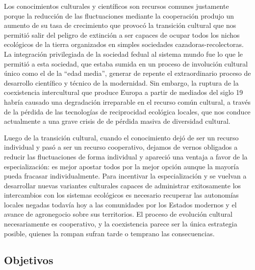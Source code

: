 \documentclass[a4paper,10pt]{book}
\theoremstyle{definition}
\begin{document}

Los conocimientos culturales y cient\'ificos son recursos comunes justamente porque la reducci\'on de las fluctuaciones mediante la cooperaci\'on produjo un aumento de su tasa de crecimiento que provoc\'o la transici\'on cultural que nos permiti\'o salir del peligro de extinci\'on a ser capaces de ocupar todos los nichos ecol\'ogicos de la tierra organizados en simples sociedades cazadoras-recolectoras.
%
La integraci\'on privilegiada de la sociedad fedual al sistema mundo fue lo que le permiti\'o a esta sociedad, que estaba sumida en un proceso de involuci\'on cultural \'unico como el de la ``edad media'', generar de repente el extraordinario proceso de desarrollo cient\'ifico y t\'ecnico de la modernidad.
%
Sin embargo, la ruptura de la coexistencia intercultural que produce Europa a partir de mediados del siglo 19 habr\'ia causado una degradaci\'on irreparable en el recurso común cultural, a través de la pérdida de las tecnolog\'ias de reciprocidad ecol\'ogica locales, que nos conduce actualmente a una grave crisis de de pérdida masiva de diversidad cultural.


Luego de la transici\'on cultural, cuando el conocimiento dej\'o de ser un recurso individual y pas\'o a ser un recurso cooperativo, dejamos de vernos obligados a reducir las fluctuaciones de forma individual y apareci\'o una ventaja a favor de la especializaci\'on: es mejor apostar todos por la mejor opci\'on aunque la mayor\'ia pueda fracasar individualmente.
%
Para incentivar la especializaci\'on y se vuelvan a desarrollar nuevas variantes culturales capaces de administrar exitosamente los intercambios con los sistemas ecol\'ogicos es necesario recuperar las autonom\'ias locales negadas todav\'ia hoy a las comunidades por los Estados modernos y el avance de agronegocio sobre sus territorios.
%
El proceso de evoluci\'on cultural necesariamente es cooperativo, y la coexistencia parece ser la \'unica estrategia posible, quienes la rompan sufran tarde o temprano las consecuencias.


\subsection{Objetivos} 
\end{document}
